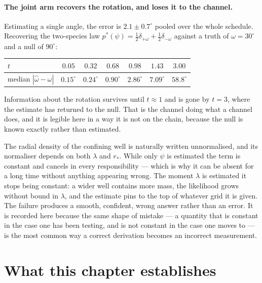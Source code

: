 \paragraph{The joint arm recovers the rotation, and loses it to the channel.}
Estimating a single angle, the error is $2.1\pm0.7^\circ$ pooled over the whole
schedule. Recovering the two-species law
$p^*(\psi)=\tfrac12\delta_{+\omega}+\tfrac12\delta_{-\omega}$ against a truth
of $\omega = 30^\circ$ and a null of $90^\circ$:

\begin{center}\small
\begin{tabular}{@{}lcccccc@{}}
\toprule
$t$ & $0.05$ & $0.32$ & $0.68$ & $0.98$ & $1.43$ & $3.00$ \\
\midrule
median $|\hat\omega - \omega|$ & $0.15^\circ$ & $0.24^\circ$ & $0.90^\circ$
& $2.86^\circ$ & $7.09^\circ$ & $58.8^\circ$ \\
\bottomrule
\end{tabular}
\end{center}

Information about the rotation survives until $t\approx1$ and is gone by
$t=3$, where the estimate has returned to the null. That is the channel doing
what a channel does, and it is legible here in a way it is not on the chain,
because the null is known exactly rather than estimated.

\begin{remark}
The radial density of the confining well is naturally written unnormalised,
and its normaliser depends on both $\lambda$ and $r_*$. While only $\psi$ is
estimated the term is constant and cancels in every responsibility --- which
is why it can be absent for a long time without anything appearing wrong. The
moment $\lambda$ is estimated it stops being constant: a wider well contains
more mass, the likelihood grows without bound in $\lambda$, and the estimate
pins to the top of whatever grid it is given. The failure produces a smooth,
confident, wrong answer rather than an error. It is recorded here because the
same shape of mistake --- a quantity that is constant in the case one has been
testing, and is not constant in the case one moves to --- is the most common
way a correct derivation becomes an incorrect measurement.
\end{remark}

\section{What this chapter establishes}\label{sec:ring-answers}


